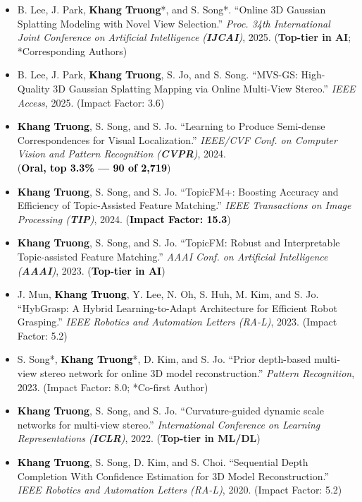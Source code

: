 \documentclass[11pt,a4paper]{article}
\newcommand{\kw}[1]{\textbf{\textcolor{black}{#1}}}
\newcommand{\hm}[1]{\textbf{\textcolor{black}{#1}}}
\begin{document}
\begin{itemize}[leftmargin=1.3em, label={}, labelsep=0pt, itemsep=5pt]
    \raggedright
    \item B. Lee, J. Park, \kw{Khang Truong}*, and S. Song*. ``Online 3D Gaussian Splatting
          Modeling with Novel View Selection.'' \textit{Proc. 34th International Joint Conference on
          Artificial Intelligence (\textbf{IJCAI})}, 2025. (\textbf{Top-tier in AI}; *Corresponding Authors)

    \item B. Lee, J. Park, \kw{Khang Truong}, S. Jo, and S. Song. ``MVS-GS: High-Quality 3D
          Gaussian Splatting Mapping via Online Multi-View Stereo.'' \textit{IEEE Access}, 2025.
          (Impact Factor: 3.6)

    \item \kw{Khang Truong}, S. Song, and S. Jo. ``Learning to Produce Semi-dense
          Correspondences for Visual Localization.'' \textit{IEEE/CVF Conf. on Computer Vision and
          Pattern Recognition (\textbf{CVPR})}, 2024.\\
          (\hm{Oral, top 3.3\% --- 90 of 2{,}719})

    \item \kw{Khang Truong}, S. Song, and S. Jo. ``TopicFM+: Boosting Accuracy and Efficiency
          of Topic-Assisted Feature Matching.'' \textit{IEEE Transactions on Image Processing
          (\textbf{TIP})}, 2024. (\hm{Impact Factor: 15.3})

    \item \kw{Khang Truong}, S. Song, and S. Jo. ``TopicFM: Robust and Interpretable
          Topic-assisted Feature Matching.'' \textit{AAAI Conf. on Artificial Intelligence
          (\textbf{AAAI})}, 2023. (\hm{Top-tier in AI})

    \item J. Mun, \kw{Khang Truong}, Y. Lee, N. Oh, S. Huh, M. Kim, and S. Jo. ``HybGrasp:
          A Hybrid Learning-to-Adapt Architecture for Efficient Robot Grasping.'' \textit{IEEE Robotics
          and Automation Letters (RA-L)}, 2023. (Impact Factor: 5.2)

    \item S. Song*, \kw{Khang Truong}*, D. Kim, and S. Jo. ``Prior depth-based multi-view
          stereo network for online 3D model reconstruction.'' \textit{Pattern Recognition}, 2023.
          (Impact Factor: 8.0; *Co-first Author)

    \item \kw{Khang Truong}, S. Song, and S. Jo. ``Curvature-guided dynamic scale networks
          for multi-view stereo.'' \textit{International Conference on Learning Representations
          (\textbf{ICLR})}, 2022. (\textbf{Top-tier in ML/DL})

    \item \kw{Khang Truong}, S. Song, D. Kim, and S. Choi. ``Sequential Depth Completion With
          Confidence Estimation for 3D Model Reconstruction.'' \textit{IEEE Robotics and Automation
          Letters (RA-L)}, 2020. (Impact Factor: 5.2)
\end{itemize}
\end{document}
